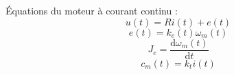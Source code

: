 \documentclass[10pt,fleqn]{article} %
\begin{document}
%
\setlength{\columnseprule}{.1pt}

\vspace{2cm}
\pagestyle{fancy}
\thispagestyle{plain}

Équations du moteur à courant continu : 
$$u(t) = Ri(t) + e(t)$$
$$e(t) = k_e(t) \omega_m(t)$$
$$J_e =\dfrac{\text{d}\omega_m(t)}{\text{d} t}$$
$$c_m(t)=k_t i(t)$$











\end{document}
